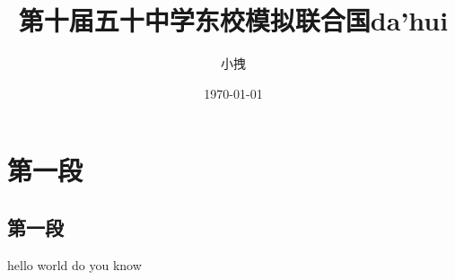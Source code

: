 \documentclass{article}
\title{第十届五十中学东校模拟联合国da'hui}
\date{\today}
\author{小拽}
\begin{document}
\maketitle
\section{第一段}
\subsection{第一段}
hello world do you know
\end{document}

